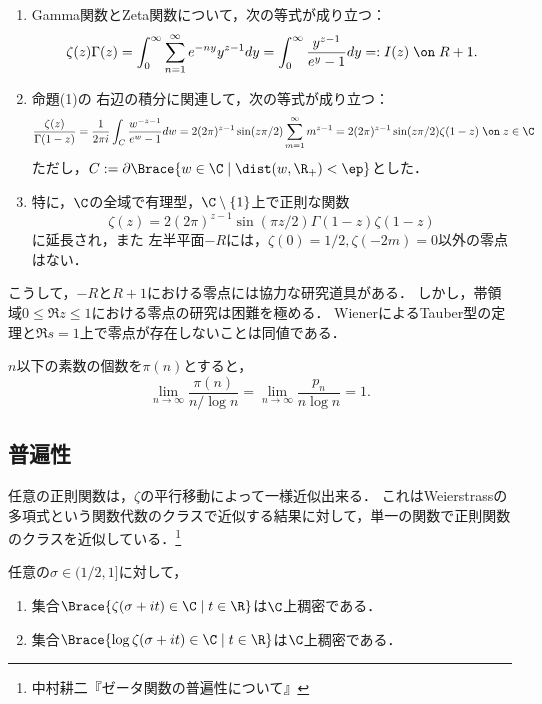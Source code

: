 \documentclass[uplatex, dvipdfmx]{jsreport}
\begin{document}
\begin{proposition}[関数等式]\mbox{}
    \begin{enumerate}
        \item Gamma関数とZeta関数について，次の等式が成り立つ：
        \[\zeta(z)\Gamma(z)=\int^\infty_0\sum^\infty_{n=1}e^{-ny}y^{z-1}dy=\int^\infty_0\frac{y^{z-1}}{e^y-1}dy=:I(z)\;\on\;R+1.\]
        \item 
        命題(1)の
        右辺の積分に関連して，次の等式が成り立つ：
        \[\frac{\zeta(z)}{\Gamma(1-z)}=\frac{1}{2\pi i}\int_C\frac{w^{-z-1}}{e^{w}-1}dw=2(2\pi)^{z-1}\sin(z\pi/2)\sum_{m=1}^\infty m^{z-1}=2(2\pi)^{z-1}\sin(z\pi/2)\zeta(1-z)\;\on\; z\in\C\]
        ただし，$C:=\partial\Brace{w\in\C\mid\dist(w,\R_+)<\ep}$とした．
        \item 特に，$\C$の全域で有理型，$\C\setminus\{1\}$上で正則な関数
        \[\zeta(z)=2(2\pi)^{z-1}\sin(\pi z/2)\Gamma(1-z)\zeta(1-z)\]
        に延長され，また
        左半平面$-R$には，$\zeta(0)=1/2,\zeta(-2m)=0$以外の零点はない．
    \end{enumerate}
\end{proposition}
\begin{remarks}
    こうして，$-R$と$R+1$における零点には協力な研究道具がある．
    しかし，帯領域$0\le \Re z\le 1$における零点の研究は困難を極める．
    WienerによるTauber型の定理と$\Re s=1$上で零点が存在しないことは同値である．
\end{remarks}

\begin{corollary}
    $n$以下の素数の個数を$\pi(n)$とすると，
    \[\lim_{n\to\infty}\frac{\pi(n)}{n/\log n}=\lim_{n\to\infty}\frac{p_n}{n\log n}=1.\]
\end{corollary}

\subsection{普遍性}

\begin{tcolorbox}[colframe=ForestGreen, colback=ForestGreen!10!white,breakable,colbacktitle=ForestGreen!40!white,coltitle=black,fonttitle=\bfseries\sffamily,
title=]
    任意の正則関数は，$\zeta$の平行移動によって一様近似出来る．
    これはWeierstrassの多項式という関数代数のクラスで近似する結果に対して，単一の関数で正則関数のクラスを近似している．\footnote{中村耕二『ゼータ関数の普遍性について』}
\end{tcolorbox}

\begin{proposition}
    任意の$\sigma\in(1/2,1]$に対して，
    \begin{enumerate}
        \item 集合$\Brace{\zeta(\sigma+it)\in\C\mid t\in\R}$は$\C$上稠密である．
        \item 集合$\Brace{\log\zeta(\sigma+it)\in\C\mid t\in\R}$は$\C$上稠密である．
    \end{enumerate}
\end{proposition}
\end{document}
